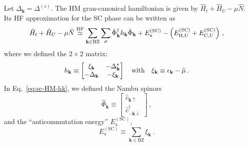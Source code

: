 Let $\Delta_\mathbf{k} = \Delta^{(s)}$. The HM gran-canonical hamiltonian is given by $\hat H_t + \hat H_U - \mu \hat N$. Its HF approximation for the SC phase can be written as
\begin{equation}\label{eq:sc-HM-hk}
	\hat H_t + \hat H_U - \mu \hat N \stackrel{\mathrm{HF}}{\simeq} \sum_{\mathbf{k} \in \mathrm{BZ}} \sum_\sigma \hat \Phi_\mathbf{k}^\dagger h_\mathbf{k} \hat \Phi_\mathbf{k} + E_\mathrm{a}^{(\mathrm{SC})} - \left(
	E_{\mathrm{H},U}^{(\mathrm{SC})} + E_{\mathrm{C},U}^{(\mathrm{SC})}
	\right) \, ,
\end{equation}
where we defined the $2 \times 2$ matrix:
\begin{equation}\label{eq:sc-hk}
	h_\mathbf{k} \equiv \begin{bmatrix}
		\xi_\mathbf{k} & -\Delta_\mathbf{k}^* \\
		-\Delta_\mathbf{k} & - \xi_\mathbf{k}
	\end{bmatrix}
	\qq{with}
	\xi_\mathbf{k} \equiv \epsilon_\mathbf{k} - \tilde{\mu} \, .
\end{equation}
In Eq.~\eqref{eq:sc-HM-hk}, we defined the Nambu spinors
\begin{equation}\label{eq:sc-Phi-def}
	\hat \Phi_\mathbf{k} \equiv \begin{bmatrix}
		\hat c_{\mathbf{k}\uparrow} \\
		\hat c_{-\mathbf{k}\downarrow}^\dagger
	\end{bmatrix} \, ,
\end{equation}
and the ``anticommutation energy'' $E_\mathrm{a}^{(\mathrm{SC})}$,
\begin{equation}\label{appeq:sc-anticommutation-energy}
	E_\mathrm{a}^{(\mathrm{SC})} \equiv \sum_{\mathbf{k}\in\mathrm{BZ}} \xi_\mathbf{k} \, .
\end{equation}

